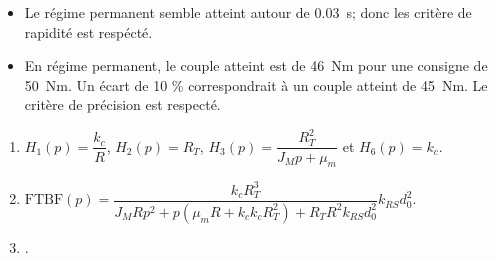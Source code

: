 %
%
%
%
%
%
%
%
%
%
%

\fi




\ifprof
\begin{corrige}
\begin{itemize}
\item Le régime permanent semble atteint autour de \SI{0,03}{s}; donc les critère de rapidité est respécté.
\item En régime permanent, le couple atteint est de \SI{46}{Nm} pour une consigne de \SI{50}{Nm}. Un écart de 10 \% correspondrait à un couple atteint de \SI{45}{Nm}. Le critère de précision est respecté.
\end{itemize}
\end{corrige}
\else
\fi




\ifprof
\else

\ifcolle
\else
\begin{solution}
\footnotesize
\begin{enumerate}
\item  $H_1(p)=\dfrac{k_c}{R}$, $H_2(p)=R_T$,  $H_3(p) = \dfrac{R_T^2}{J_M p  + \mu_m }$ et   $H_6(p)={k_c}$.
\item $\text{FTBF}(p)= \dfrac{k_c R_T^3}{J_MR p^2  + p\left(\mu_m R  +k_ck_c R_T^2\right)+R_TR^2k_{RS}d_0^2}k_{RS}d_0^2 $.
\item .
\end{enumerate} 
\normalsize
\end{solution}
\fi


\fi
